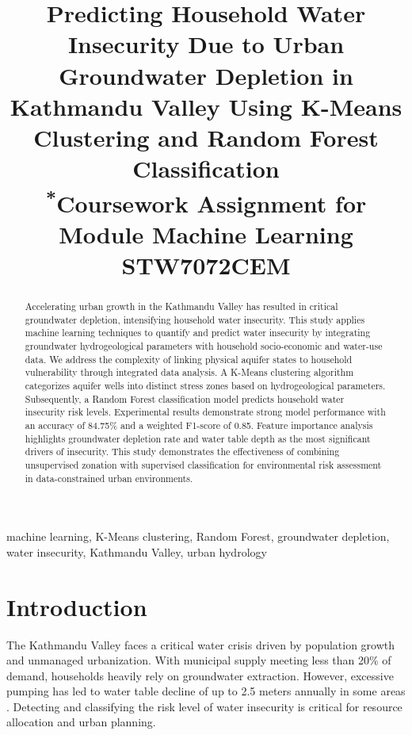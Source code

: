 \documentclass[conference]{IEEEtran}
\begin{document}
\title{Predicting Household Water Insecurity Due to Urban Groundwater Depletion in Kathmandu Valley Using K-Means Clustering and Random Forest Classification\\{\footnotesize \textsuperscript{*}Coursework Assignment for Module Machine Learning STW7072CEM}}


\author{
}

\maketitle

\begin{abstract}
Accelerating urban growth in the Kathmandu Valley has resulted in critical groundwater depletion, intensifying household water insecurity. This study applies machine learning techniques to quantify and predict water insecurity by integrating groundwater hydrogeological parameters with household socio-economic and water-use data. We address the complexity of linking physical aquifer states to household vulnerability through integrated data analysis. A K-Means clustering algorithm categorizes aquifer wells into distinct stress zones based on hydrogeological parameters. Subsequently, a Random Forest classification model predicts household water insecurity risk levels. Experimental results demonstrate strong model performance with an accuracy of 84.75\% and a weighted F1-score of 0.85. Feature importance analysis highlights groundwater depletion rate and water table depth as the most significant drivers of insecurity. This study demonstrates the effectiveness of combining unsupervised zonation with supervised classification for environmental risk assessment in data-constrained urban environments.
\end{abstract}

\begin{IEEEkeywords}
machine learning, K-Means clustering, Random Forest, groundwater depletion, water insecurity, Kathmandu Valley, urban hydrology
\end{IEEEkeywords}

\section{Introduction}
The Kathmandu Valley faces a critical water crisis driven by population growth and unmanaged urbanization. With municipal supply meeting less than 20\% of demand, households heavily rely on groundwater extraction. However, excessive pumping has led to water table decline of up to 2.5 meters annually in some areas \cite{shrestha2018groundwater}. Detecting and classifying the risk level of water insecurity is critical for resource allocation and urban planning.
\end{document}
